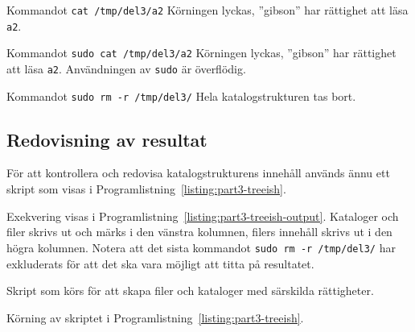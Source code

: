              {Kommandot \texttt{cat /tmp/del3/a2}}
             {Körningen lyckas, ''gibson'' har rättighet att läsa \texttt{a2}.}

             {Kommandot \texttt{sudo cat /tmp/del3/a2}}
             {Körningen lyckas, ''gibson'' har rättighet att läsa \texttt{a2}.
              Användningen av \texttt{sudo} är överflödig.}

             {Kommandot \texttt{sudo rm -r /tmp/del3/}}
             {Hela katalogstrukturen tas bort.}

\subsection{Redovisning av resultat}
För att kontrollera och redovisa katalogstrukturens innehåll används ännu ett
skript som visas i Programlistning~\ref{listing:part3-treeish}.

Exekvering visas i Programlistning~\ref{listing:part3-treeish-output}. Kataloger
och filer skrivs ut och märks i den vänstra kolumnen, filers innehåll skrivs ut
i den högra kolumnen. Notera att det sista kommandot \texttt{sudo rm -r /tmp/del3/}
har exkluderats för att det ska vara möjligt att titta på resultatet.

\begin{listing}[H]
\caption[Skript för att skapa katalogstruktur med rättigheter]{Skript som körs
         för att skapa filer och kataloger med särskilda rättigheter.}
\label{listing:part3-treeish}
\end{listing}

\begin{listing}[H]
\caption{Körning av skriptet i Programlistning~\ref{listing:part3-treeish}.}
\label{listing:part3-treeish-output}
\end{listing}
